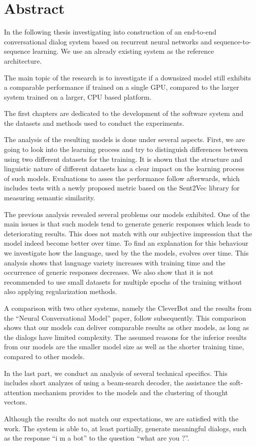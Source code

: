 \chapter*{Abstract}
In the following thesis investigating into construction of an end-to-end conversational dialog system based on recurrent neural networks and sequence-to-sequence learning. We use an already existing system as the reference architecture. 

The main topic of the research is to investigate if a downsized model still exhibits a comparable performance if trained on a single GPU, compared to the larger system trained on a larger, CPU based platform.

The first chapters are dedicated to the development of the software system and the datasets and methods used to conduct the experiments.

The analysis of the resulting models is done under several aspects. First, we are going to look into the learning process and try to distinguish differences between using two different datasets for the training. It is shown that the structure and linguistic nature of different datasets has a clear impact on the learning process of such models. Evaluations to asses the performance follow afterwards, which includes tests with a newly proposed metric based on the Sent2Vec library for measuring semantic similarity.

The previous analysis revealed several problems our models exhibited. One of the main issues is that such models tend to generate generic responses which leads to deteriorating results. This does not match with our subjective impression that the model indeed become better over time. To find an explanation for this behaviour we investigate how the language, used by the the models, evolves over time. This analysis shows that language variety increases with training time and the occurrence of generic responses decreases. We also show that it is not recommended to use small datasets for multiple epochs of the training without also applying regularization methods.

A comparison with two other systems, namely the CleverBot and the results from the ``Neural Conversational Model'' paper, follow subsequently. This comparison shows that our models can deliver comparable results as other models, as long as the dialogs have limited complexity. The assumed reasons for the inferior results from our models are the smaller model size as well as the shorter training time, compared to other models.

In the last part, we conduct an analysis of several technical specifics. This includes short analyzes of using a beam-search decoder, the assistance the soft-attention mechanism provides to the models and the clustering of thought vectors. 

Although the results do not match our expectations, we are satisfied with the work. The system is able to, at least partially, generate meaningful dialogs, such as the response ``i m a bot'' to the question ``what are you ?''.
